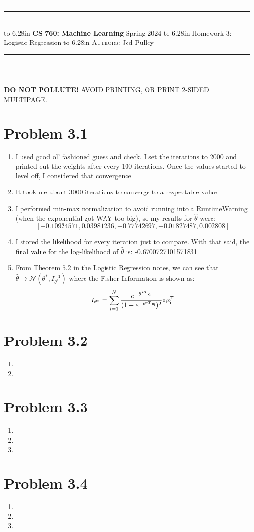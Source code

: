 \documentclass{article}
\newcommand{\lecture}[2]{
\pagestyle{myheadings}
\thispagestyle{plain}
\newpage
\noindent
\begin{center}
\rule{\textwidth}{1.6pt}\vspace*{-\baselineskip}\vspace*{2pt} %
\rule{\textwidth}{0.4pt}\\[1\baselineskip] %
\vbox{\vspace{2mm}
\hbox to 6.28in { {\bf CS 760: Machine Learning} \hfill Spring 2024 }
\vspace{4mm}
\hbox to 6.28in { {\Large \hfill #1  \hfill} }
\vspace{4mm}
\hbox to 6.28in { {\scshape Authors:}  #2 \hfill }}
\vspace{-2mm}
\rule{\textwidth}{0.4pt}\vspace*{-\baselineskip}\vspace{3.2pt} %
\rule{\textwidth}{1.6pt}\\[\baselineskip] %
\end{center}
\vspace*{4mm}
}
\begin{document}
\lecture{Homework 3: Logistic Regression}{Jed Pulley}

\begin{center}
{\Large {\sf \underline{\textbf{DO NOT POLLUTE!}} AVOID PRINTING, OR PRINT 2-SIDED MULTIPAGE.}}
\end{center}

\section*{Problem 3.1}
\begin{enumerate}[label=(\alph*)]
  \item I used good ol' fashioned guess and check. I set the iterations to 2000 and printed out the weights after every 100 iterations. Once the values started to level off, I considered that convergence
  \item It took me about 3000 iterations to converge to a respectable value
  \item I performed min-max normalization to avoid running into a RuntimeWarning (when the exponential got WAY too big), so my results for $\hat{\theta}$ were: \[[-0.10924571, 0.03981236, -0.77742697, -0.01827487, 0.002808]\]
  \item I stored the likelihood for every iteration just to compare. With that said, the final value for the log-likelihood of $\hat{\theta}$ is: -0.6700727101571831
  \item From Theorem 6.2 in the Logistic Regression notes, we can see that $\hat{\theta} \longrightarrow  \mathcal{N}(\theta^*, I^{-1}_{\theta^*})$ where the Fisher Information is shown as: \[I_{\theta^*} = \sum_{i=1}^{N}\frac{e^{-\theta^{*T}\sf{x}_i}}{(1 + e^{-\theta^{*T}\sf{x}_i})^2}\sf{x}_i\sf{x}^T_i\]
\end{enumerate}

\section*{Problem 3.2}
\begin{enumerate}[label=(\alph*)]
  \item 
  \item 
\end{enumerate}

\section*{Problem 3.3}
\begin{enumerate}[label=(\alph*)]
  \item 
  \item 
  \item 
\end{enumerate}

\section*{Problem 3.4}
\begin{enumerate}[label=(\alph*)]
  \item 
  \item 
  \item 
\end{enumerate}
\end{document}

